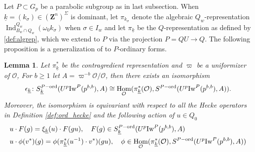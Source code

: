 \documentclass[leqno]{amsart}
\newtheorem{lem}[thm]{Lemma}
\theoremstyle{definition}
\theoremstyle{remark}
\newcommand{\oo}{\mathcal{O}}
\newcommand{\Z}{{\mathbf{Z}}}
\DeclareMathOperator{\Hom}{Hom}
\DeclareMathOperator{\Ind}{Ind}
\newcommand{\wt}[1]{\underline{ #1 }}
\newcommand{\Iw}{\textnormal{Iw}} %
\newcommand{\ord}{\textnormal{ord}} %
\begin{document}
Let $P\subset G_p$ be a parabolic subgroup 
as in last subsection.
When $\wt{k}=(k_\sigma)\in (\Z^n)^{\Sigma}$ is dominant,
let $\pi_{k_{\sigma}}$
denote the algebraic $Q_w$-representation
$\Ind_{B_w\cap Q_w}^{Q_w}(\omega_0 k_\sigma)$
when $\sigma\in I_w$
and let  $\pi_{\wt{k}}$
be the $Q$-representation
as defined by \eqref{def:algrep},
which we extend to $P$ via the projection  $P=QU\to Q$.
The following proposition
is a generalization of \cite[Prop 2.22]{ger}
to $P$-ordinary forms.

\begin{lem}
	Let $\pi_{\wt{k}}^*$ be the contragredient
	representation and
	$\varpi$ be a uniformizer of $\oo$,
	For $b\geq 1$ let $A=\varpi^{-b}\oo/\oo$,
	then there exists an isomorphism
	\[
		\epsilon_{\wt{k}} \colon 
		S_{\wt{k}}^{P-\ord}(U^p\Iw^P(p^{b,b}),A)\cong 
		\Hom_{\oo}(\pi_{\wt{k}}^*(\oo),
		S^{P-\ord}(U^p\Iw^P(p^{b,b}),A)).
	\]
	Moreover, the isomorphism is equivariant 
	with respect to all the Hecke operators
	in Definition \ref{def:ord_hecke}
	and the following action of $u\in Q_0$
	\begin{align*}
	&u\cdot F(g)=\xi_{\wt{k}}(u)\cdot F(gu),\quad
	F(g)\in S_{\wt{k}}^{P-\ord}(U^p\Iw^P(p^{b,b}),A)\\
	&u\cdot \phi(v^*)(g)=
	\phi(\pi^*_{\wt{k}}(u^{-1})\cdot v^*)(gu),\quad
	\phi\in \Hom_{\oo}(\pi_{\wt{k}}^*(\oo),
	S^{P-\ord}(U^p\Iw^P(p^{b,b}),A))
	\end{align*}
\end{lem}
\end{document}
